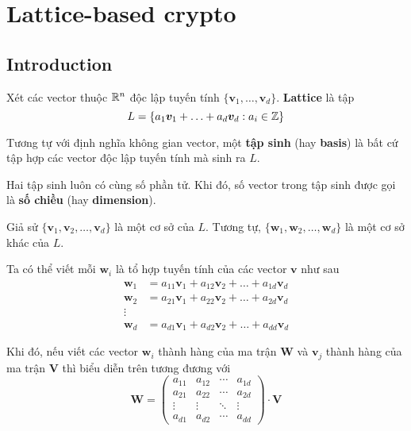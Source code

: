 \chapter{Lattice-based crypto}

\section{Introduction}

\begin{definition}[Lattice]
    Xét các vector thuộc $\mathbb{R}^n$ độc lập tuyến tính $\{ \bm{v}_1, \ldots, \bm{v}_d \}$. \textbf{Lattice} là tập
    \begin{equation}
        L = \{ a_1 \bm{v}_1 + \ldots + a_d \bm{v}_d : a_i \in \mathbb{Z} \}
    \end{equation}
\end{definition}

Tương tự với định nghĩa không gian vector, một \textbf{tập sinh} (hay \textbf{basis}) là bất cứ tập hợp các vector độc lập tuyến tính mà sinh ra $L$.

Hai tập sinh luôn có cùng số phần tử. Khi đó, số vector trong tập sinh được gọi là \textbf{số chiều} (hay \textbf{dimension}).

Giả sử $\{ \bm{v}_1, \bm{v}_2, \ldots, \bm{v}_d \}$ là một cơ sở của $L$. Tương tự, $\{ \bm{w}_1, \bm{w}_2, \ldots, \bm{w}_d \}$ là một cơ sở khác của $L$.

Ta có thể viết mỗi $\bm{w}_i$ là tổ hợp tuyến tính của các vector $\bm{v}$ như sau
\begin{align*}
    \bm{w}_1 & = a_{11} \bm{v}_1 + a_{12} \bm{v}_2 + \ldots + a_{1d} \bm{v}_d \\
    \bm{w}_2 & = a_{21} \bm{v}_1 + a_{22} \bm{v}_2 + \ldots + a_{2d} \bm{v}_d \\
    \vdots & \\
    \bm{w}_d & = a_{d1} \bm{v}_1 + a_{d2} \bm{v}_2 + \ldots + a_{dd} \bm{v}_d
\end{align*}

Khi đó, nếu viết các vector $\bm{w}_i$ thành hàng của ma trận $\bm{W}$ và $\bm{v}_j$ thành hàng của ma trận $\bm{V}$ thì biểu diễn trên tương đương với
\begin{equation*}
    \bm{W} = \begin{pmatrix}
        a_{11} & a_{12} & \cdots & a_{1d} \\
        a_{21} & a_{22} & \cdots & a_{2d} \\
        \vdots & \vdots & \ddots & \vdots \\
        a_{d1} & a_{d2} & \cdots & a_{dd}
    \end{pmatrix} \cdot \bm{V}
\end{equation*}

